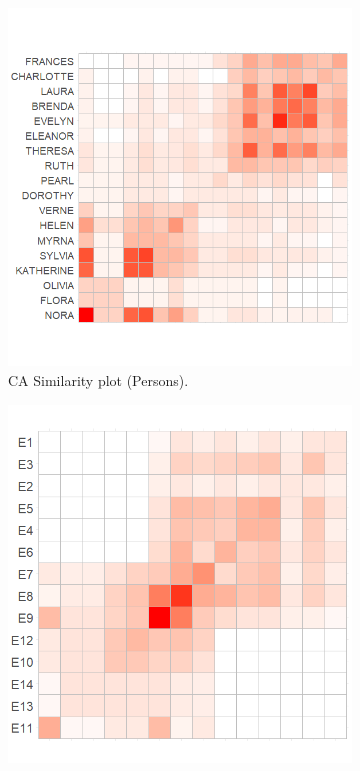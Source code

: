 \documentclass[a4paper,fleqn]{cas-sc}
\begin{document}
\begin{figure}
    \captionsetup[subfigure]{font=footnotesize,labelfont=footnotesize}
    \centering
     \begin{subfigure}[b]{0.425\textwidth}
        \includegraphics[width=1.0\textwidth]{Plots/p-ca-sim.png}
            \caption{CA Similarity plot (Persons).}
            \label{fig:p-ca-sim}
    \end{subfigure}
     \begin{subfigure}[b]{0.4\textwidth}
        \includegraphics[width=1.0\textwidth]{Plots/g-ca-sim.png}

\end{subfigure}
\end{figure}
\end{document}
